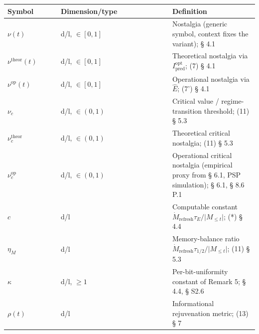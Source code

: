 \documentclass[pdflatex,sn-mathphys-ay]{sn-jnl}
\begin{document}
\begin{center}\small
\begin{tabular}{@{} >{\raggedright\arraybackslash}p{0.2105\linewidth} >{\raggedright\arraybackslash}p{0.4474\linewidth} >{\raggedright\arraybackslash}p{0.3421\linewidth}@{}}
\toprule

\begin{minipage}[b]{\linewidth}\raggedright

Symbol

\end{minipage} & \begin{minipage}[b]{\linewidth}\raggedright

Dimension/type

\end{minipage} & \begin{minipage}[b]{\linewidth}\raggedright

Definition

\end{minipage} \\

\midrule

\(\nu(t)\) & d/l, \(\in [0, 1]\) & Nostalgia (generic symbol, context fixes the variant); § 4.1 \\

\(\nu^{\text{theor}}(t)\) & d/l, \(\in [0, 1]\) & Theoretical nostalgia via \(I_{\text{pred}}^{\text{opt}}\); (7) § 4.1 \\

\(\nu^{\text{op}}(t)\) & d/l, \(\in [0, 1]\) & Operational nostalgia via \(\hat E\); (7') § 4.1 \\

\(\nu_c\) & d/l, \(\in (0, 1)\) & Critical value / regime-transition threshold; (11) § 5.3 \\

\(\nu_c^{\text{theor}}\) & d/l, \(\in (0, 1)\) & Theoretical critical nostalgia; (11) § 5.3 \\

\(\nu_c^{\text{op}}\) & d/l, \(\in (0, 1)\) & Operational critical nostalgia (empirical proxy from § 6.1, PSP simulation); § 6.1, § 8.6 P.1 \\

\(c\) & d/l & Computable constant \(\dot{M}_{\text{refresh}} \tau_E / \lvert M_{\le t}\rvert\); (*) § 4.4 \\

\(\eta_M\) & d/l & Memory-balance ratio \(\dot{M}_{\text{refresh}} \tau_{1/2}/\lvert M_{\le t}\rvert\); (11) § 5.3 \\

\(\kappa\) & d/l, \(\ge 1\) & Per-bit-uniformity constant of Remark 5; § 4.4, § S2.6 \\

\(\rho(t)\) & d/l & Informational rejuvenation metric; (13) § 7 \\

\bottomrule
\end{tabular}
\end{center}
\end{document}
